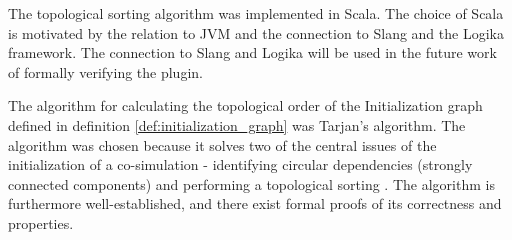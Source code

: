 \documentclass[runningheads]{llncs}
\begin{document}
The topological sorting algorithm was implemented in Scala. The choice of Scala is motivated by the relation to JVM and the connection to Slang and the Logika framework\cite{inbook}. The connection to Slang and Logika will be used in the future work of formally verifying the plugin.

The algorithm for calculating the topological order of the Initialization graph defined in definition \ref{def:initialization_graph} was Tarjan's algorithm. The algorithm was chosen because it solves two of the central issues of the initialization of a co-simulation - identifying circular dependencies (strongly connected components) and performing a topological sorting \cite{tarjan_1972}. The algorithm is furthermore well-established, and there exist formal proofs of its correctness and properties\cite{stefan_merz}. 



%



\end{document}
